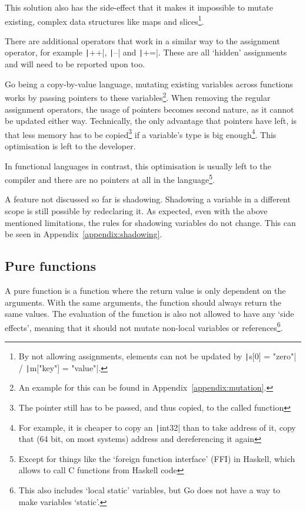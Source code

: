 This solution also has the side-effect that it makes it impossible to mutate
existing, complex data structures like maps and slices\footnote{By not
    allowing assignments, elements can not be updated by
\texttt|s[0] = "zero"| / \texttt|m["key"] = "value"|.}.

There are additional operators that work in a similar way to the assignment
operator, for example \texttt|++|, \texttt|--| and
\texttt|+=|. These are all `hidden' assignments and will need to
be reported upon too.

Go being a \gls{copy-by-value} language, mutating existing variables
across functions works by passing pointers to these variables\footnote{
An example for this can be found in Appendix~\ref{appendix:mutation}.}.
When removing the regular assignment operators, the usage of pointers becomes
second nature, as it cannot be updated either way.
Technically, the only advantage that pointers have left, is that less memory has
to be copied\footnote{The pointer still has to be passed, and thus copied, to the
called function} if a variable's type is big enough\footnote{For example, it is
	cheaper to copy an \texttt|int32| than to take address of it, copy that
(64 bit, on most systems) address and dereferencing it again}.
This optimisation is left to the developer.

In functional languages in contrast, this optimisation is usually left to the compiler
and there are no pointers at all in the language\footnote{Except for things like the `foreign
function interface' (FFI) in Haskell, which allows to call C functions from Haskell code}.

A feature not discussed so far is shadowing. Shadowing a variable in a different
scope is still possible by redeclaring it. As expected, even with the above
mentioned limitations, the rules for shadowing variables do not change. This
can be seen in Appendix~\ref{appendix:shadowing}.

\subsection{Pure functions}

A pure function is a function where the return value is only dependent on
the arguments. With the same arguments, the function should always return
the same values. The evaluation of the function is also not allowed to have
any `side effects', meaning that it should not mutate non-local variables or
references\footnote{This also includes `local static' variables, but Go does
not have a way to make variables `static'.}.

